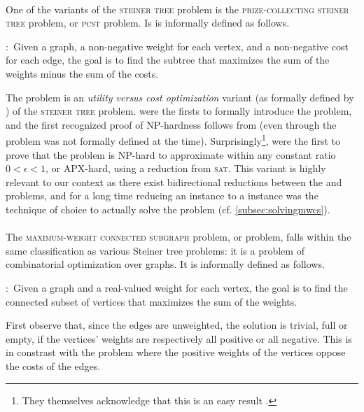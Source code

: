 	\paragraph{}
	One of the variants of the \textsc{steiner tree} problem is the \textsc{prize-collecting steiner tree} problem, or \textsc{pcst} problem.
	Is is informally defined as follows.

	\textbf{\pcst{}$\colon$} Given a graph, a non-negative weight for each vertex, and a non-negative cost for each edge, the goal is to find the subtree that maximizes the sum of the weights minus the sum of the costs.

	The \pcst{} problem is an \emph{utility versus cost optimization} variant (as formally defined by \textcite{conrad2007connections}) of the \textsc{steiner tree} problem.
	\Textcite{bienstock1993note} were the firsts to formally introduce the problem, and the first recognized proof of NP-hardness follows from \textcite{camerini1979complexity} (even through the problem was not formally defined at the time).
	Surprisingly\footnote{They themselves acknowledge that this is an easy result \parencite[footnote 12]{feigenbaum2000sharing}.}, \textcite{feigenbaum2000sharing} were the first to prove that the \pcst{} problem is NP-hard to approximate within any constant ratio $0 < \epsilon < 1$, or APX-hard, using a reduction from \textsc{sat}.
	This variant is highly relevant to our context as there exist bidirectional reductions between the \pcst{} and \mwcs{} problems, and for a long time reducing an \mwcs{} instance to a \pcst{} instance was the technique of choice to actually solve the problem (cf. \cref{subsec:solvingmwcs}).

	\paragraph{}
	The \textsc{maximum-weight connected subgraph} problem, or \mwcs{} problem, falls within the same classification as various Steiner tree problems: it is a problem of combinatorial optimization over graphs.
	It is informally defined as follows.

	\textbf{\mwcs{}$\colon$} Given a graph and a real-valued weight for each vertex, the goal is to find the connected subset of vertices that maximizes the sum of the weights.

	First observe that, since the edges are unweighted, the solution is trivial, full or empty, if the vertices' weights are respectively all positive or all negative.
	This is in constrast with the \pcst{} problem where the positive weights of the vertices oppose the costs of the edges.

